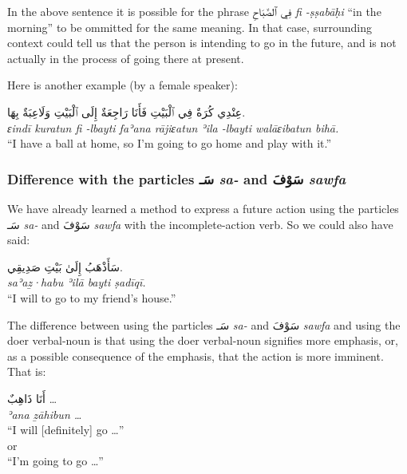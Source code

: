 \documentclass[
  10pt,
]{book}
\begin{document}
In the above sentence it is possible for the phrase
\foreignlanguage{arabic}{فِي ٱلصَّبَاحِ}
\emph{fi -ṣṣabāḥi}
\enquote{in the morning}
to be ommitted for the same meaning. In that case, surrounding context could tell us that the person is intending to go in the future, and is not actually in the process of going there at present.

Here is another example (by a female speaker):

\foreignlanguage{arabic}{عِنْدِي کُرَةٌ فِي ٱلْبَيْتِ فَأَنَا رَاجِعَةٌ إِلَى ٱلْبَيْتِ وَلَاعِبَةٌ بِهَا.}\\
\emph{ɛindī kuratun fi -lbayti faʾana rājiɛatun ʾila -lbayti walāɛibatun bihā.}\\
\enquote{I have a ball at home, so I'm going to go home and play with it.}

\subsubsection{\texorpdfstring{Difference with the particles \foreignlanguage{arabic}{سَـ} \emph{sa-} and \foreignlanguage{arabic}{سَوْفَ} \emph{sawfa}}{Difference with the particles سَـ sa- and سَوْفَ sawfa}}\label{difference-with-the-particles-ux633ux640-sa--and-ux633ux648ux641-sawfa}

We have already learned a method to express a future action using the particles \foreignlanguage{arabic}{سَـ} \emph{sa-} and \foreignlanguage{arabic}{سَوْفَ} \emph{sawfa} with the incomplete-action verb. So we could also have said:

\foreignlanguage{arabic}{سَأَذْهَبُ إِلَىٰ بَيْتِ صَدِيقِي.}\\
\emph{saʾaẕ·habu ʾilā bayti ṣadīqī.}\\
\enquote{I will to go to my friend's house.}

The difference between using the particles \foreignlanguage{arabic}{سَـ} \emph{sa-} and \foreignlanguage{arabic}{سَوْفَ} \emph{sawfa} and using the doer verbal-noun is that using the doer verbal-noun signifies more emphasis, or, as a possible consequence of the emphasis, that the action is more imminent. That is:

\foreignlanguage{arabic}{أَنَا ذَاهِبٌ \ldots{}}\\
\emph{ʾana ẕāhibun \ldots{}}\\
\enquote{I will {[}definitely{]} go \ldots{}}\\
or\\
\enquote{I'm going to go \ldots{}}
\end{document}

